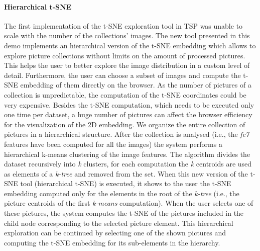 \paragraph{Hierarchical t-SNE}
The first implementation of the t-SNE exploration tool in TSP was unable to scale with the number of the collections' images. The new tool presented in this demo implements an hierarchical version of the t-SNE embedding which allows to explore picture collections without limits on the amount of processed pictures. 
This helps the user to better explore the image distribution in a custom level of detail. Furthermore, the user can choose a subset of images and compute the t-SNE embedding of them directly on the browser. %
As the number of pictures of a collection is unpredictable, the computation of the t-SNE coordinates could be very expensive. Besides the t-SNE computation, which needs to be executed only one time per dataset, a huge number of pictures can affect the browser efficiency for the visualization of the 2D embedding. We organize the entire collection of pictures in a hierarchical structure. After the collection is analysed (i.e., the \textit{fc7} features have been computed for all the images) the system performs a hierarchical k-means clustering of the image features. The algorithm divides the dataset recursively into \textit{k} clusters, for each computation the \textit{k} centroids are used as elements of a \textit{k-tree} and removed from the set. %
When this new version of the t-SNE tool (hierarchical t-SNE) is executed, it shows to the user the t-SNE embedding computed only for the elements in the root of the \textit{k-tree} (i.e., the picture centroids of the first \textit{k-means} computation). When the user selects one of these pictures, the system computes the t-SNE of the pictures included in the child node corresponding to the selected picture element. This hierarchical exploration can be continued by selecting one of the shown pictures and computing the t-SNE embedding for its sub-elements in the hierarchy.



